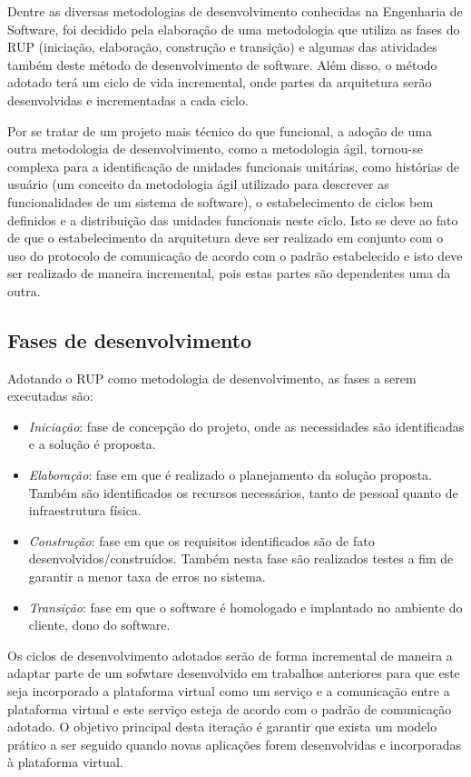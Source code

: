Dentre as diversas metodologias de desenvolvimento conhecidas na Engenharia de Software, foi decidido pela elaboração de uma metodologia que utiliza as fases do RUP (iniciação, elaboração, construção e transição) e algumas das atividades também deste método de desenvolvimento de software. Além disso, o método adotado terá um ciclo de vida incremental, onde partes da arquitetura serão desenvolvidas e incrementadas a cada ciclo.

Por se tratar de um projeto mais técnico do que funcional, a adoção de uma outra metodologia de desenvolvimento, como a metodologia ágil, tornou-se complexa para a identificação de unidades funcionais unitárias, como histórias de usuário (um conceito da metodologia ágil utilizado para descrever as funcionalidades de um sistema de software), o estabelecimento de ciclos bem definidos e a distribuição das unidades funcionais neste ciclo. Isto se deve ao fato de que o estabelecimento da arquitetura deve ser realizado em conjunto com o uso do protocolo de comunicação de acordo com o padrão estabelecido e isto deve ser realizado de maneira incremental, pois estas partes são dependentes uma da outra.

\subsection{Fases de desenvolvimento}

Adotando o RUP como metodologia de desenvolvimento, as fases a serem executadas são:

\begin{itemize}
\item \textit{Iniciação}: fase de concepção do projeto, onde as necessidades são identificadas e a solução é proposta.
\item \textit{Elaboração}: fase em que é realizado o planejamento da solução proposta. Também são identificados os recursos necessários, tanto de pessoal quanto de infraestrutura física.
\item \textit{Construção}: fase em que os requisitos identificados são de fato desenvolvidos/construídos. Também nesta fase são realizados testes a fim de garantir a menor taxa de erros no sistema.
\item \textit{Transição}: fase em que o software é homologado e implantado no ambiente do cliente, dono do software.
\end{itemize}

Os ciclos de desenvolvimento adotados serão de forma incremental de maneira a adaptar parte de um sofwtare desenvolvido em trabalhos anteriores para que este seja incorporado a plataforma virtual como um serviço e a comunicação entre a plataforma virtual e este serviço esteja de acordo com o padrão de comunicação adotado. O objetivo principal desta iteração é garantir que exista um modelo prático a ser seguido quando novas aplicações forem desenvolvidas e incorporadas à plataforma virtual.


